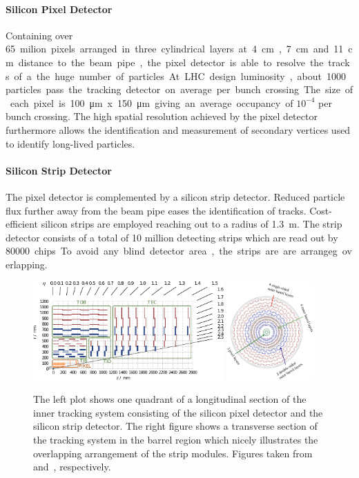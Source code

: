 \paragraph{Silicon Pixel Detector} Containing over \SI{65} milion pixels
arranged in three cylindrical layers at \SI{4}{\centi\meter},
\SI{7}{\centi\meter} and \SI{11}{\centi\meter} distance to the beam pipe, the
pixel detector is able to resolve the tracks of a the huge number of particles.
At LHC design luminosity, about 1000 particles pass the tracking detector on
average per bunch crossing. The size of each pixel is \SI{100}{\micro \meter} x
\SI{150}{\micro \meter} giving an average occupancy of $10^{-4}$ per bunch
crossing. The high spatial resolution achieved by the pixel detector furthermore
allows the identification and measurement of secondary vertices used to identify
long-lived particles.

\paragraph{Silicon Strip Detector} The pixel detector is complemented by a silicon
strip detector. Reduced particle flux further away from the beam pipe eases the identification
of tracks. Cost-efficient silicon strips are employed reaching out to
a radius of \SI{1.3}{\meter}. The strip detector consists of a total of 10 million
detecting strips which are read out by \SI{80000} chips. To avoid any blind
detector area, the strips are are arrangeg overlapping.

\begin{figure}[htp]
    \centering
    \includegraphics[width=0.65\textwidth]{figures/cms_detector/tracker.pdf}\hfill
    \includegraphics[width=0.3\textwidth]{figures/cms_detector/tracking_sytem_barrel_slice.png}
    \caption[Inner Tracking System]{The left plot shows one quadrant of a
        longitudinal section of the inner tracking system consisting of the
        silicon pixel detector and the silicon strip detector. The right figure shows a
        transverse section of the tracking system in the barrel region which
        nicely illustrates the overlapping arrangement of the strip modules. Figures taken
        from~\cite{Berger:2014aca} and~\cite{cmsweb:innertracker}, respectively.}
    \label{fig:cms:inner_tracking}
\end{figure}

